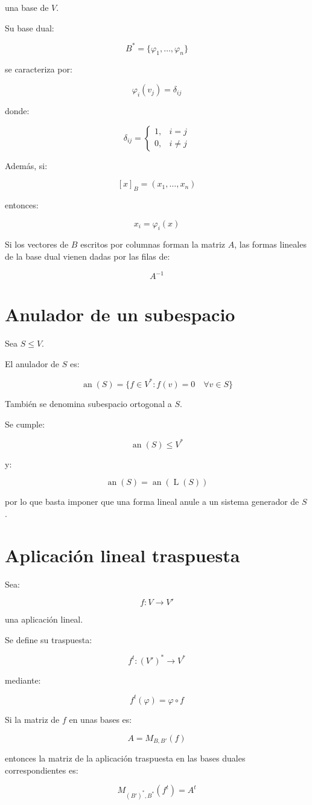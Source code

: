 \documentclass[11pt,a4paper]{article}
\newcommand{\Span}{\operatorname{L}}
\newcommand{\an}{\operatorname{an}}
\begin{document}
una base de $V$.

Su base dual:

\[
B^*=
\{\varphi_1,\ldots,\varphi_n\}
\]

se caracteriza por:

\[
\boxed{
\varphi_i(v_j)=\delta_{ij}
}
\]

donde:

\[
\delta_{ij}
=
\begin{cases}
1, & i=j\\
0, & i\neq j
\end{cases}
\]

Además, si:

\[
[x]_B=(x_1,\ldots,x_n)
\]

entonces:

\[
\boxed{
x_i=\varphi_i(x)
}
\]

Si los vectores de $B$ escritos por columnas forman la matriz $A$, las formas lineales de la base dual vienen dadas por las filas de:

\[
\boxed{
A^{-1}
}
\]

\section{Anulador de un subespacio}

Sea $S\leq V$.

El anulador de $S$ es:

\[
\boxed{
\an(S)
=
\{
f\in V^*:
f(v)=0
\quad
\forall v\in S
\}
}
\]

También se denomina subespacio ortogonal a $S$.

Se cumple:

\[
\an(S)\leq V^*
\]

y:

\[
\an(S)=\an(\Span(S))
\]

por lo que basta imponer que una forma lineal anule a un sistema generador de $S$.

\section{Aplicación lineal traspuesta}

Sea:

\[
f:V\longrightarrow V'
\]

una aplicación lineal.

Se define su traspuesta:

\[
f^t:(V')^*\longrightarrow V^*
\]

mediante:

\[
\boxed{
f^t(\varphi)
=
\varphi\circ f
}
\]

Si la matriz de $f$ en unas bases es:

\[
A=M_{B,B'}(f)
\]

entonces la matriz de la aplicación traspuesta en las bases duales correspondientes es:

\[
\boxed{
M_{(B')^*,B^*}(f^t)
=
A^t
}
\]
\end{document}
